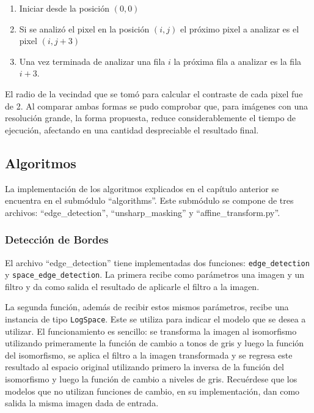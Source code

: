 \begin{enumerate}
	\item Iniciar desde la posici\'on $(0,0)$
	\item Si se analiz\'o el pixel en la posici\'on $(i,j)$ el pr\'oximo pixel a analizar es el pixel $(i,j+3)$
	\item Una vez terminada de analizar una fila $i$ la pr\'oxima fila a analizar es la fila $i+3$.
\end{enumerate}

El radio de la vecindad que se tom\'o para calcular el contraste de cada pixel fue de 2. Al comparar ambas formas se pudo comprobar que, para im\'agenes con una resoluci\'on grande, la forma propuesta, reduce considerablemente el tiempo de ejecuci\'on, afectando en una cantidad despreciable el resultado final.

\subsection{Algoritmos}

La implementaci\'on de los algoritmos explicados en el cap\'itulo anterior se encuentra en el subm\'odulo ``algorithms''. Este subm\'odulo se compone de tres archivos: ``edge\_detection'', ``unsharp\_masking'' y ``affine\_transform.py''.

\subsubsection{Detecci\'on de Bordes}

El archivo ``edge\_detection'' tiene implementadas dos funciones: \verb|edge_detection| y \verb|space_edge_detection|. La primera recibe como par\'ametros una imagen y un filtro y da como salida el resultado de aplicarle el filtro a la imagen. 

La segunda funci\'on, adem\'as de recibir estos mismos par\'ametros, recibe una instancia de tipo \verb|LogSpace|. Este se utiliza para indicar el modelo que se desea a utilizar. El funcionamiento es sencillo: se transforma la imagen al isomorfismo utilizando primeramente la funci\'on de cambio a tonos de gris y luego la funci\'on del isomorfismo, se aplica el filtro a la imagen transformada y se regresa este resultado al espacio original utilizando primero la inversa de la funci\'on del isomorfismo y luego la funci\'on de cambio a niveles de gris. Recu\'erdese que los modelos que no utilizan funciones de cambio, en su implementaci\'on, dan como salida la misma imagen dada de entrada.

